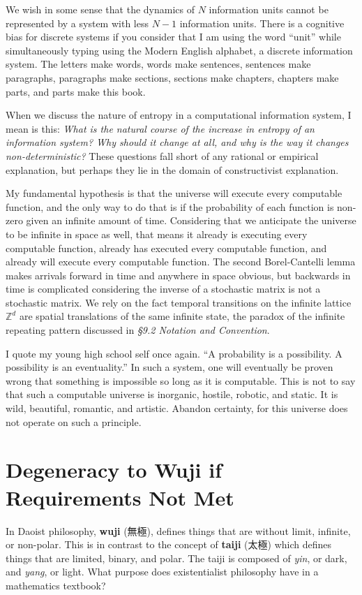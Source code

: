 \documentclass[10pt, a5paper, twoside, openright]{memoir}
\begin{document}
We wish in some sense that the dynamics of $N$ information units cannot be represented by a system with less $N-1$ information units. There is a cognitive bias for discrete systems if you consider that I am using the word ``unit'' while simultaneously typing using the Modern English alphabet, a discrete information system. The letters make words, words make sentences, sentences make paragraphs, paragraphs make sections, sections make chapters, chapters make parts, and parts make this book.

When we discuss the nature of entropy in a computational information system, I mean is this: \textit{What is the natural course of the increase in entropy of an information system? Why should it change at all, and why is the way it changes non-deterministic?} These questions fall short of any rational or empirical explanation, but perhaps they lie in the domain of constructivist explanation. 

My fundamental hypothesis is that the universe will execute every computable function, and the only way to do that is if the probability of each function is non-zero given an infinite amount of time. Considering that we anticipate the universe to be infinite in space as well, that means it already is executing every computable function, already has executed every computable function, and already will execute every computable function. The second Borel-Cantelli lemma makes arrivals forward in time and anywhere in space obvious, but backwards in time is complicated considering the inverse of a stochastic matrix is not a stochastic matrix. We rely on the fact temporal transitions on the infinite lattice $\mathbb Z^d$ are spatial translations of the same infinite state, the paradox of the infinite repeating pattern discussed in \textit{\S 9.2 Notation and Convention}.

I quote my young high school self once again. ``A probability is a possibility. A possibility is an eventuality.'' In such a system, one will eventually be proven wrong that something is impossible so long as it is computable. This is not to say that such a computable universe is inorganic, hostile, robotic, and static. It is wild, beautiful, romantic, and artistic. Abandon certainty, for this universe does not operate on such a principle.

\section{Degeneracy to Wuji if Requirements Not Met}
In Daoist philosophy, \textbf{wuji} (無極), defines things that are without limit, infinite, or non-polar. This is in contrast to the concept of \textbf{taiji} (太極) which defines things that are limited, binary, and polar. The taiji is composed of \textit{yin}, or dark, and \textit{yang}, or light. What purpose does existentialist philosophy have in a mathematics textbook?
\end{document}
